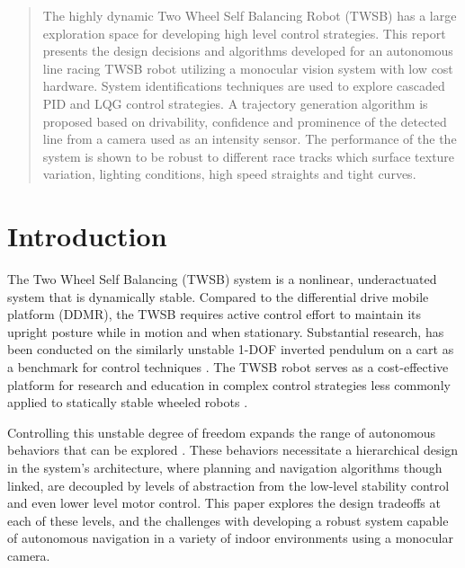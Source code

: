     \begin{abstract} %
        The highly dynamic Two Wheel Self Balancing Robot 
        (TWSB) has a large exploration space for developing high level 
        control strategies. 
        This report presents the design decisions and algorithms developed for
        an autonomous line racing TWSB robot utilizing a monocular vision system with low cost hardware. 
        System identifications techniques are used to explore
        cascaded PID and LQG control strategies.
        A trajectory generation algorithm is proposed based on drivability, confidence 
        and prominence of the detected line from a camera used as an intensity sensor. 
        The performance of the the system is shown to be robust to different race tracks which
        surface texture variation, lighting conditions, high speed straights and tight curves. 
  \end{abstract}%
  \clearpage

  \uomdeclarations

    \section{Introduction}
    The Two Wheel Self Balancing (TWSB) system is a nonlinear, underactuated system that is dynamically stable.
    Compared to the differential drive mobile platform (DDMR), the TWSB requires active control effort
    to maintain its upright posture while in motion and when stationary.
    Substantial research, has been conducted on the similarly unstable 1-DOF inverted pendulum on a cart 
    as a benchmark for control techniques \cite{boubaker2013inverted}. 
    The TWSB robot serves as a cost-effective platform for research and education in complex control 
    strategies less commonly applied to statically stable wheeled robots \cite{educationPlatform}.
    
    Controlling this unstable degree of freedom expands the range of autonomous behaviors that 
    can be explored \cite{RoboLimbo} \cite{jeong2008wheeled} \cite{Browning2004TurningSI}. 
    These behaviors necessitate a hierarchical design in the system's architecture,
    where planning and navigation algorithms though linked, are decoupled by levels of abstraction 
    from the low-level stability control and even lower level motor control. This paper explores 
    the design tradeoffs at each of these levels, and the challenges with developing a robust system 
    capable of autonomous navigation in a variety of indoor environments using a monocular camera.
    
